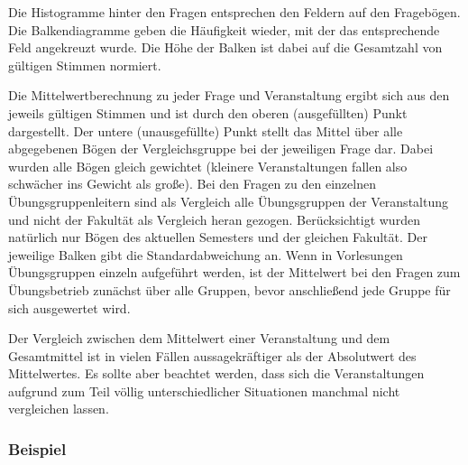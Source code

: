 Die Histogramme hinter den Fragen entsprechen den Feldern auf den Fragebögen. 
Die Balkendiagramme geben die Häufigkeit wieder, mit der das entsprechende 
Feld angekreuzt wurde. Die Höhe der Balken ist dabei auf die Gesamtzahl von 
gültigen Stimmen normiert.

Die Mittelwertberechnung zu jeder Frage und Veranstaltung ergibt sich aus den 
jeweils gültigen Stimmen und ist durch den oberen (ausgefüllten)
Punkt dargestellt. Der untere (unausgefüllte) Punkt stellt das Mittel
über alle abgegebenen Bögen der Vergleichsgruppe bei der jeweiligen Frage dar. Dabei wurden alle Bögen gleich gewichtet (kleinere Veranstaltungen
fallen also schwächer ins Gewicht als große). Bei den Fragen zu den
einzelnen Übungsgruppenleitern sind als Vergleich alle Übungsgruppen
der Veranstaltung und nicht der Fakultät als Vergleich heran gezogen. Berücksichtigt
wurden natürlich nur Bögen des aktuellen Semesters und der gleichen
Fakultät. Der jeweilige Balken gibt die Standardabweichung an. 
Wenn in Vorlesungen Übungsgruppen einzeln aufgeführt werden, ist der
Mittelwert bei den Fragen zum Übungsbetrieb zunächst über alle
Gruppen, bevor anschließend jede Gruppe für sich ausgewertet wird. 

Der Vergleich zwischen dem
Mittelwert einer Veranstaltung und dem  
Gesamtmittel ist in vielen Fällen aussagekräftiger als der Absolutwert des 
Mittelwertes. Es sollte aber beachtet werden, dass sich die Veranstaltungen 
aufgrund zum Teil völlig unterschiedlicher Situationen manchmal nicht 
vergleichen lassen.

\subsubsection{Beispiel}


